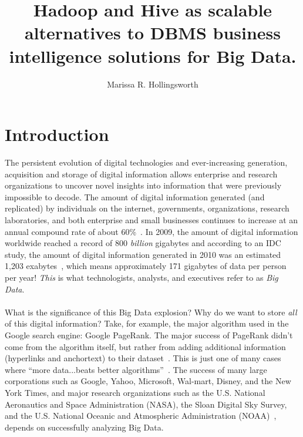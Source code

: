 \documentclass[letterpaper,12pt,titlepage]{article}
\title{Hadoop and Hive as scalable alternatives to DBMS business intelligence
solutions for Big Data.}
\author{Marissa R. Hollingsworth}
\begin{document}
\maketitle

\section{Introduction}
The persistent evolution of digital technologies and ever-increasing
generation, acquisition and storage of digital information allows enterprise
and research organizations to uncover novel insights into information that were
previously impossible to decode. The amount of digital information generated
(and replicated) by individuals on the internet, governments, organizations,
research laboratories, and both enterprise and small businesses continues to
increase at an annual compound rate of about 60\%~\cite{monstrous}\cite{emc}.
In 2009, the amount of digital information worldwide reached a record of 800
\textit{billion} gigabytes and according to an IDC study, the amount of digital
information generated in 2010 was an estimated 1,203
exabytes~\cite{emc}\cite{ohlhorst}, which means approximately 171 gigabytes of
data per person per year! \textit{This} is what technologists, analysts, and
executives refer to as \textit{Big Data}. 
\\\\
What is the significance of this Big Data explosion? Why do we want
to store \textit{all} of this digital information? Take, for example, the major
algorithm used in the Google search engine: Google PageRank. The major success
of PageRank didn't come from the algorithm itself, but rather from adding
additional information (hyperlinks and anchortext) to their
dataset~\cite{pagerank}. This is just one of many cases where ``more
data...beats better algorithms''~\cite{white}. The success of many large
corporations such as Google, Yahoo, Microsoft, Wal-mart, Disney, and the New
York Times, and major research organizations such as the U.S. National
Aeronautics and Space Administration (NASA), the Sloan Digital Sky Survey, and
the U.S. National Oceanic and Atmospheric Administration
(NOAA)~\cite{dataeverywhere}\cite{ohlhorst}, depends on successfully analyzing
Big Data.
\end{document}
